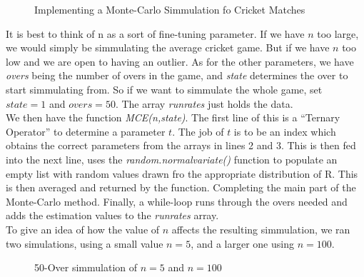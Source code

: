 \begin{figure}[h] %
    \label{mcecode}
    
    \caption{Implementing a Monte-Carlo Simmulation fo Cricket Matches}
\end{figure}

It is best to think of n as a sort of fine-tuning parameter. If we have $n$ too large, we would simply be simmulating the average cricket game. But if we have $n$ too low and 
we are open to having an outlier. As for the other parameters, we have \textit{overs} being the number of overs in the game, and \textit{state} determines the over to start 
simmulating from. So if we want to simmulate the whole game, set $state=1$ and $overs=50$. The array \textit{runrates} just holds the data.\\

We then have the function \textit{MCE(n,state)}. The first line of this is a ``Ternary Operator'' to determine a parameter $t$. The job of $t$ is to be an index which obtains 
the correct parameters from the arrays in lines 2 and 3. This is then fed into the next line, uses the \textit{random.normalvariate()} function to populate an empty list with random 
values drawn fro the appropriate distribution of R. This is then averaged and returned by the function. Completing the main part of the Monte-Carlo method.
Finally, a while-loop runs through the overs needed and adds the estimation values to the \textit{runrates} array. \\

To give an idea of how the value of $n$ affects the resulting simmulation, we ran two simulations, using a small value $n=5$, and a larger one using $n=100$. 

\begin{figure}[h]
    \centering
    \qquad
    \caption{50-Over simmulation of $n=5$ and $n=100$}
    \label{MeanAndSDRR}
\end{figure}

